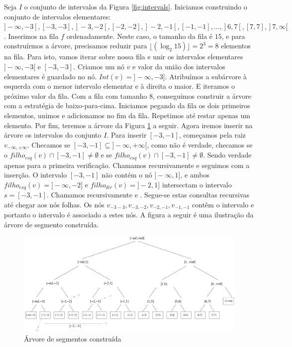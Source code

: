Seja $I$ o conjunto de intervalos da Figura \ref{fig:intervals}. Iniciamos construindo o conjunto de intervalos elementares: $]-\infty, -3[ , [-3, -3], ]-3, -2[, [-2,-2], ]-2, -1[, [-1, -1], \dots, ]6, 7[, [7,7], ]7, \infty [$. Inserimos na fila $f$ ordenadamente. Neste caso, o tamanho da fila é $15$, e para construírmos a árvore, precisamos reduzir para $\lfloor(\log_2{15})\rfloor = 2^3 = 8$ elementos na fila. Para isto, vamos iterar sobre nossa fila e unir os intervalos elementares $]-\infty, -3[$ e $[-3, -3]$. Criamos um nó $v$ e valor da união dos intervalos elementares é guardado no nó. $Int(v) = ]-\infty, -3]$. Atribuímos a subárvore à esquerda com o menor intervalo elementar e à direita o maior. E iteramos o próximo valor da fila.
Com a fila com tamanho $8$, conseguimos construir a árvore com a estratégia de baixo-para-cima. Iniciamos pegando da fila os dois primeiros elementos, unimos e adicionamos no fim da fila. Repetimos até restar apenas um elemento. Por fim, teremos a árvore da Figura \ref{fig:segment_tree2} a seguir.
Agora iremos inserir na árvore os intervalos do conjunto $I$. Para inserir $[-3, -1]$, começamos pela raiz $v_{-\infty, +\infty}$. Checamos se $[-3, -1] \subseteq ]-\infty, +\infty[$, como não é verdade, checamos se o $filho_{esq}(v) \cap [-3,-1] \neq \emptyset$ e se $filho_{esq}(v) \cap [-3,-1]\neq \emptyset$. Sendo verdade apenas para a primeira verificação. Chamamos recursivamente  e seguimos com a inserção. O intervalo $[-3,-1]$ não contém o  nó $]-\infty, 1]$, e ambos $filho_{esq}(v) = ]-\infty, -2] $ e $filho_{dir}(v) = ]-2, 1]$ intersectam o intervalo $s = [-3, -1]$. Chamamos recursivamente  e . Segue-se estas consultas recursivas até chegar aos nós folhas. Os nós $v_{-3 -3}, v_{-3, -2}, v_{-2, -1}, v_{-1, -1}$ contêm o intervalo e portanto o intervalo é associado a estes nós.
A figura a seguir é uma ilustração da  árvore de segmento construída.
\begin{figure}[h!]
     \centering
     \includegraphics[scale=0.5]{images/arvore_seg.pdf}
     \caption{Árvore de segmentos construída}
     \label{fig:segment_tree2}
 \end{figure}

